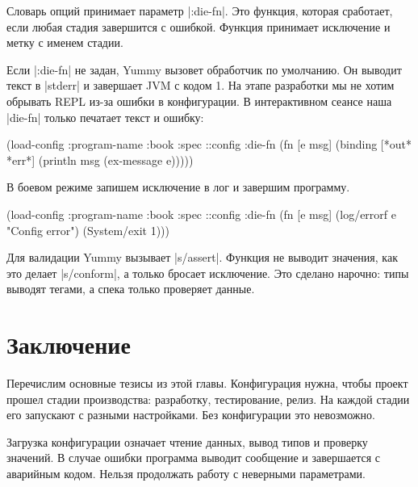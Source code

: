 
Словарь опций принимает параметр \spverb|:die-fn|. Это функция, которая
сработает, если любая стадия завершится с ошибкой. Функция принимает исключение
и метку с именем стадии.


Если \spverb|:die-fn| не задан, Yummy вызовет обработчик по умолчанию. Он
выводит текст в \spverb|stderr| и завершает JVM с кодом 1. На этапе разработки
мы не хотим обрывать REPL из-за ошибки в конфигурации. В интерактивном сеансе
наша \spverb|die-fn| только печатает текст и ошибку:

\begin{english}
  \begin{clojure}
(load-config
 {:program-name :book
  :spec ::config
  :die-fn (fn [e msg]
            (binding [*out* *err*]
              (println msg (ex-message e))))})
  \end{clojure}
\end{english}

\noindent
В боевом режиме запишем исключение в лог и завершим программу.


\begin{english}
  \begin{clojure}
(load-config
 {:program-name :book
  :spec ::config
  :die-fn (fn [e msg]
            (log/errorf e "Config error")
            (System/exit 1))})
  \end{clojure}
\end{english}

Для валидации Yummy вызывает \spverb|s/assert|. Функция не выводит значения, как
это делает \spverb|s/conform|, а только бросает исключение. Это сделано нарочно:
типы выводят тегами, а спека только проверяет данные.

\section{Заключение}

Перечислим основные тезисы из этой главы. Конфигурация нужна, чтобы проект
прошел стадии производства: разработку, тестирование, релиз. На каждой стадии
его запускают с разными настройками. Без конфигурации это невозможно.

Загрузка конфигурации означает чтение данных, вывод типов и проверку значений. В
случае ошибки программа выводит сообщение и завершается с аварийным
кодом. Нельзя продолжать работу с неверными параметрами.

